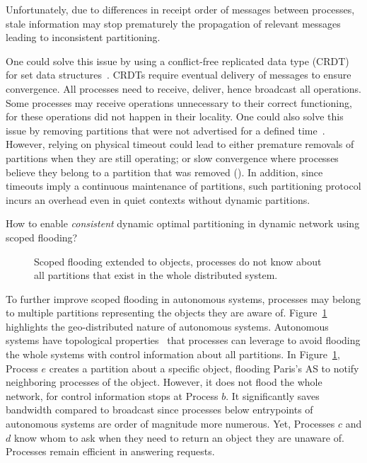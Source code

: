 Unfortunately, due to differences in receipt order of messages between
processes, stale information may stop prematurely the propagation of
relevant messages leading to inconsistent partitioning.

One could solve this issue by using a conflict-free replicated data
type (CRDT) for set data structures~\cite{shapiro2011crdts}. CRDTs
require eventual delivery of messages to ensure convergence. All
processes need to receive, deliver, hence broadcast all
operations. Some processes may receive operations unnecessary to their
correct functioning, for these operations did not happen in their
locality.  One could also solve this issue by removing partitions that
were not advertised for a defined
time~\cite{hemmati2015namebased}.  However, relying on physical timeout could lead to
either premature removals of partitions when they are still operating;
or slow convergence where processes believe they belong to a partition
that was removed (). In addition, since timeouts imply a
continuous maintenance of partitions, such partitioning protocol
incurs an overhead even in quiet contexts without dynamic partitions.

\begin{problem}
  How to enable \emph{consistent} dynamic optimal partitioning in
  dynamic network using scoped flooding?
\end{problem}


\begin{figure}
  \begin{center}
    
    \caption{\label{fig:ASmotivation}Scoped flooding extended to
      objects, processes do not know about all partitions that exist
      in the whole distributed system.}
  \end{center}
\end{figure}

To further improve scoped flooding in autonomous systems, processes
may belong to multiple partitions representing the objects they are
aware of. Figure~\ref{fig:ASmotivation} highlights the geo-distributed
nature of autonomous systems. Autonomous systems have topological
properties~\cite{nur2018geography} that processes can leverage to
avoid flooding the whole systems with control information about all
partitions. In Figure~\ref{fig:ASmotivation}, Process $e$ creates a
partition about a specific object, flooding Paris's AS to notify
neighboring processes of the object. However, it does not flood the
whole network, for control information stops at Process $b$. It
significantly saves bandwidth compared to broadcast since processes
below entrypoints of autonomous systems are order of magnitude more
numerous. Yet, Processes $c$ and $d$ know whom to ask when they need
to return an object they are unaware of. Processes remain efficient in
answering requests. 

